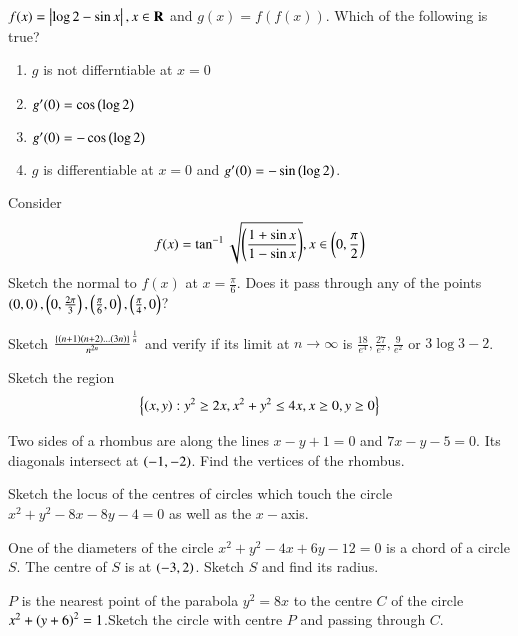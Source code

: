 \documentclass[journal,12pt,onecolumn]{IEEEtran}
\begin{document}
\begin{problem}
$f(x) = \left\vert\log 2 - \sin x\right\vert, x \in \mathbf{R}$ and $g(x)=f(f(x))$.  Which of the following is true?
\begin{enumerate}
\item $g$ is not differntiable at $x=0$
\item $g^{\prime}(0) = \cos \left(\log 2\right)$
\item $g^{\prime}(0) = -\cos \left(\log 2\right)$
\item $g$ is differentiable at $x=0$ and $g^{\prime }(0) = -\sin \left(\log 2\right)$.
\end{enumerate}
\end{problem}
\begin{problem}
Consider 
\begin{equation*}
f(x) = \tan^{-1}\sqrt{\left(\frac{1+\sin x }{1-\sin x}\right)}, x \in \left(0,\frac{\pi}{2}\right)
\end{equation*}
Sketch the normal to $f(x)$ at $x = \frac{\pi}{6}$. Does it pass through any of the points $\left(0,0\right),\left(0,\frac{2\pi}{3}\right),\left(\frac{\pi}{6},0\right),\left(\frac{\pi}{4},0\right)$?
\end{problem}
\begin{problem}
Sketch $\frac{\left\{\left(n+1\right)\left(n+2\right)\dots \left(3n\right)\right\}}{n^{2n}}^{\frac{1}{n}}$ and verify if its limit at $n \rightarrow \infty $ is $\frac{18}{e^4},\frac{27}{e^2},\frac{9}{e^2}$ or $3\log 3 -2$.
\end{problem}
\begin{problem}
Sketch the region 
\begin{equation*}
\left\{\left(x,y\right): y^2 \geq 2x, x^2+y^2 \leq 4x, x \geq 0, y \geq 0 \right\}
\end{equation*}
\end{problem}
\begin{problem}
Two sides of a rhombus are along the lines $x-y+1 = 0$ and $7x-y-5=0$. Its diagonals intersect at $\left(-1,-2\right)$. Find the vertices of the rhombus.
\end{problem}
\begin{problem}
Sketch the locus of the centres of circles which touch the circle $x^2+y^2-8x-8y-4=0$ as well as the $x-$axis. 
\end{problem}
\begin{problem}
One of the diameters of the  circle $x^2+y^2-4x+6y-12 = 0$ is a chord of a circle $S$. The centre of $S$ is at $\left(-3,2\right)$. Sketch $S$ and find its radius.
\end{problem}
\begin{problem}
$P$ is the nearest point of the parabola $y^2=8x$ to the centre $C$ of the circle $x^2+\left(y+6\right)^2=1$.Sketch the circle with centre $P$ and passing through $C$.
\end{problem}
\end{document}
